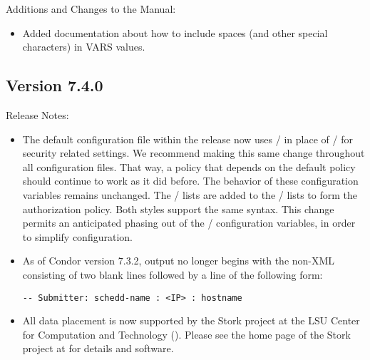 \noindent Additions and Changes to the Manual:

\begin{itemize}

\item Added documentation about how to include spaces (and other
special characters) in  VARS values.

\end{itemize}


\subsection*{\label{sec:New-7-4-0}Version 7.4.0}

\noindent Release Notes:

\begin{itemize}

\item The default configuration file within the release now uses
  / in place of
  / for security related settings.
  We recommend making this
  same change throughout all configuration files.  That way,
  a policy that depends on the default policy should continue to
  work as it did before.  The behavior of these configuration variables
  remains unchanged.  The / lists are
  added to the / lists to form the
  authorization policy.  Both styles support the same syntax.  
  This change permits an anticipated
  phasing out of the /  configuration
  variables, in order to simplify configuration.

\item As of Condor version 7.3.2,   output no longer 
  begins with the non-XML consisting of two blank lines followed by a line
  of the following form:

\begin{verbatim}
-- Submitter: schedd-name : <IP> : hostname
\end{verbatim}

\item All  data placement is now supported by the Stork
project at the 
LSU Center for Computation and Technology
().
Please see the home page of the Stork project at
 for details and
software.

\end{itemize}


